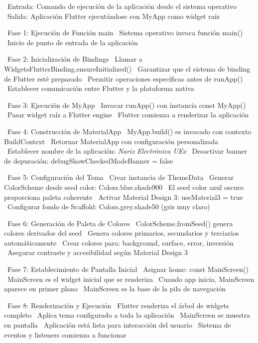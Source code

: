 \begin{algorithmic}[1]
\State~Entrada: Comando de ejecución de la aplicación desde el sistema operativo
\State~Salida: Aplicación Flutter ejecutándose con MyApp como widget raíz

\State~Fase 1: Ejecución de Función main
\State~Sistema operativo invoca función main() %
\State~Inicio de punto de entrada de la aplicación

\State~Fase 2: Inicialización de Bindings
\State~Llamar a WidgetsFlutterBinding.ensureInitialized() %
\State~Garantizar que el sistema de binding de Flutter esté preparado
\State~Permitir operaciones específicas antes de runApp() %
\State~Establecer comunicación entre Flutter y la plataforma nativa

\State~Fase 3: Ejecución de MyApp
\State~Invocar runApp() con instancia const MyApp() %
\State~Pasar widget raíz a Flutter engine
\State~Flutter comienza a renderizar la aplicación

\State~Fase 4: Construcción de MaterialApp
\State~MyApp.build() es invocado con contexto BuildContext %
\State~Retornar MaterialApp con configuración personalizada
\State~Establecer nombre de la aplicación: \textit{Nariz Electrónica UEx}
\State~Desactivar banner de depuración: debugShowCheckedModeBanner = false

\State~Fase 5: Configuración del Tema
\State~Crear instancia de ThemeData
\State~Generar ColorScheme desde seed color: Colors.blue.shade900
\State~El seed color azul oscuro proporciona paleta coherente
\State~Activar Material Design 3: useMaterial3 = true
\State~Configurar fondo de Scaffold: Colors.grey.shade50 (gris muy claro)

\State~Fase 6: Generación de Paleta de Colores
\State~ColorScheme.fromSeed() genera colores derivados del seed %
\State~Genera colores primarios, secundarios y terciarios automáticamente
\State~Crear colores para: background, surface, error, inversión
\State~Asegurar contraste y accesibilidad según Material Design 3

\State~Fase 7: Establecimiento de Pantalla Inicial
\State~Asignar home: const MainScreen() %
\State~MainScreen es el widget inicial que se renderiza
\State~Cuando app inicia, MainScreen aparece en primer plano
\State~MainScreen es la base de la pila de navegación

\State~Fase 8: Renderización y Ejecución
\State~Flutter renderiza el árbol de widgets completo
\State~Aplica tema configurado a toda la aplicación
\State~MainScreen se muestra en pantalla
\State~Aplicación está lista para interacción del usuario
\State~Sistema de eventos y listeners comienza a funcionar

\end{algorithmic}